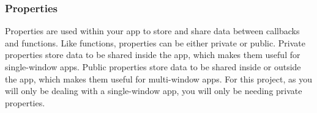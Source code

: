 \documentclass[../MATLAB_Primer.tex]{subfiles}
\begin{document}
\subsubsection{Properties}
Properties are used within your app to store and share data between callbacks and functions. Like functions, properties can be either private or public. Private properties store data to be shared inside the app, which makes them useful for single-window apps. Public properties store data to be shared inside or outside the app, which makes them useful for multi-window apps. For this project, as you will only be dealing with a single-window app, you will only be needing private properties.
\end{document}
